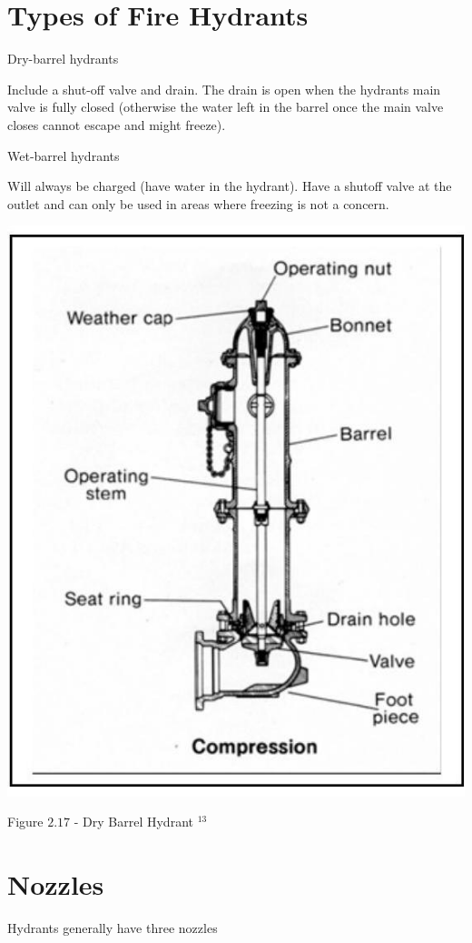 \documentclass[10pt]{article}
\begin{document}
\section{Types of Fire Hydrants}
Dry-barrel hydrants

Include a shut-off valve and drain. The drain is open when the hydrants main valve is fully closed (otherwise the water left in the barrel once the main valve closes cannot escape and might freeze).

Wet-barrel hydrants

Will always be charged (have water in the hydrant). Have a shutoff valve at the outlet and can only be used in areas where freezing is not a concern.

\includegraphics[max width=\textwidth]{DryBarrellFireHydrant}

Figure $2.17$ - Dry Barrel Hydrant ${ }^{13}$

\section{Nozzles}
Hydrants generally have three nozzles
\end{document}
